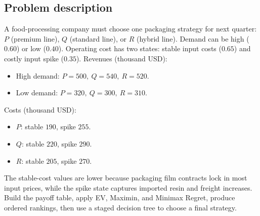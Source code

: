 


	
	\begin{ExamProblems}
		\item\leavevmode\par
		\subsection*{Problem description}
		A food-processing company must choose one packaging strategy for next quarter:
		$P$ (premium line), $Q$ (standard line), or $R$ (hybrid line).
		Demand can be high ($0.60$) or low ($0.40$).
		Operating cost has two states: stable input costs ($0.65$) and costly input spike ($0.35$).
		Revenues (thousand USD):
		\begin{itemize}
			\item High demand: $P=500,\ Q=540,\ R=520$.
			\item Low demand: $P=320,\ Q=300,\ R=310$.
		\end{itemize}
		Costs (thousand USD):
		\begin{itemize}
			\item $P$: stable $190$, spike $255$.
			\item $Q$: stable $220$, spike $290$.
			\item $R$: stable $205$, spike $270$.
		\end{itemize}
		The stable-cost values are lower because packaging film contracts lock in most input prices, while the spike state captures imported resin and freight increases.
		Build the payoff table, apply EV, Maximin, and Minimax Regret, produce ordered rankings, then use a staged decision tree to choose a final strategy.


\end{ExamProblems}
